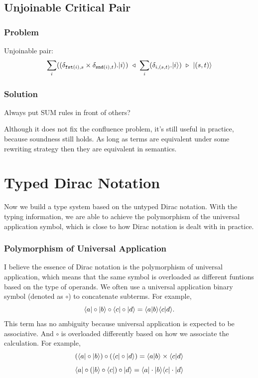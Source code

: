 \subsection{Unjoinable Critical Pair}
\subsubsection*{Problem}
Unjoinable pair:
$$
\sum_i ((\delta_{\texttt{fst}(i), s} \times \delta_{\texttt{snd}(i), t}).|i\rangle)\ \triangleleft\  \sum_i (\delta_{i, (s, t)} . |i\rangle) \ \triangleright\  |(s, t)\rangle
$$

\subsubsection*{Solution}
Always put \textsf{SUM} rules in front of others?

Although it does not fix the confluence problem, it's still useful in practice, because soundness still holds. As long as terms are equivalent under some rewriting strategy then they are equivalent in semantics.




\section{Typed Dirac Notation}

Now we build a type system based on the untyped Dirac notation. With the typing information, we are able to achieve the polymorphism of the universal application symbol, which is close to how Dirac notation is dealt with in practice.

\subsubsection*{Polymorphism of Universal Application}

I believe the essence of Dirac notation is the polymorphism of universal application, which means that the same symbol is overloaded as different funtions based on the type of operands. We often use a universal application binary symbol (denoted as $\circ$) to concatenate subterms. For example, 
$$
\langle a| \circ |b\rangle \circ \langle c| \circ |d\rangle = \langle a | b \rangle \langle c | d \rangle.
$$
This term has no ambiguity because universal application is expected to be associative. And $\circ$ is overloaded differently based on how we associate the calculation. For example,
$$
(\langle a| \circ |b\rangle) \circ (\langle c| \circ |d\rangle) = \langle a | b \rangle \times \langle c | d \rangle
$$
$$
\langle a| \circ (|b\rangle \circ \langle c|) \circ |d\rangle = \langle a | \cdot | b \rangle\langle c | \cdot | d \rangle
$$

